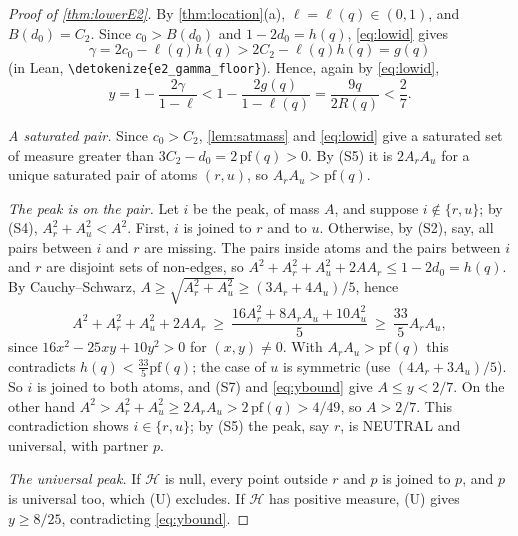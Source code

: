 \documentclass[10pt]{article}
\theoremstyle{definition}
\theoremstyle{remark}
\numberwithin{equation}{section}
\newcommand{\Hole}{\mathcal{H}}
\newcommand{\leanid}[1]{\expandafter\nolinkurl\expandafter{\detokenize{#1}}}
\begin{document}
\begin{proof}[Proof of \cref{thm:lowerE2}]
By \cref{thm:location}(a), $\ell=\ell(q)\in(0,1)$, and $B(d_0)=C_2$. Since $c_0>B(d_0)$ and $1-2d_0=h(q)$, \eqref{eq:lowid} gives
\[
 \gamma=2c_0-\ell(q)h(q)>2C_2-\ell(q)h(q)=g(q)
\]
(in Lean, \leanid{e2_gamma_floor}). Hence, again by \eqref{eq:lowid},
\begin{equation}\label{eq:ybound}
 y=1-\frac{2\gamma}{1-\ell}<1-\frac{2g(q)}{1-\ell(q)}=\frac{9q}{2R(q)}<\frac27 .
\end{equation}

\emph{A saturated pair.} Since $c_0>C_2$, \cref{lem:satmass} and \eqref{eq:lowid} give a saturated set of measure greater than $3C_2-d_0=2\,\mathrm{pf}(q)>0$. By (S5) it is $2A_rA_u$ for a unique saturated pair of atoms $(r,u)$, so $A_rA_u>\mathrm{pf}(q)$.

\emph{The peak is on the pair.} Let $i$ be the peak, of mass $A$, and suppose $i\notin\{r,u\}$; by (S4), $A_r^2+A_u^2<A^2$. First, $i$ is joined to $r$ and to $u$. Otherwise, by (S2), say, all pairs between $i$ and $r$ are missing. The pairs inside atoms and the pairs between $i$ and $r$ are disjoint sets of non-edges, so $A^2+A_r^2+A_u^2+2AA_r\le1-2d_0=h(q)$. By Cauchy--Schwarz, $A\ge\sqrt{A_r^2+A_u^2}\ge(3A_r+4A_u)/5$, hence
\[
 A^2+A_r^2+A_u^2+2AA_r\ \ge\ \frac{16A_r^2+8A_rA_u+10A_u^2}5\ \ge\ \frac{33}5A_rA_u,
\]
since $16x^2-25xy+10y^2>0$ for $(x,y)\ne0$. With $A_rA_u>\mathrm{pf}(q)$ this contradicts $h(q)<\frac{33}5\mathrm{pf}(q)$; the case of $u$ is symmetric (use $(4A_r+3A_u)/5$). So $i$ is joined to both atoms, and (S7) and \eqref{eq:ybound} give $A\le y<2/7$. On the other hand $A^2>A_r^2+A_u^2\ge2A_rA_u>2\,\mathrm{pf}(q)>4/49$, so $A>2/7$. This contradiction shows $i\in\{r,u\}$; by (S5) the peak, say $r$, is NEUTRAL and universal, with partner $p$.

\emph{The universal peak.} If $\Hole$ is null, every point outside $r$ and $p$ is joined to $p$, and $p$ is universal too, which (U) excludes. If $\Hole$ has positive measure, (U) gives $y\ge8/25$, contradicting \eqref{eq:ybound}.
\end{proof}
\end{document}
